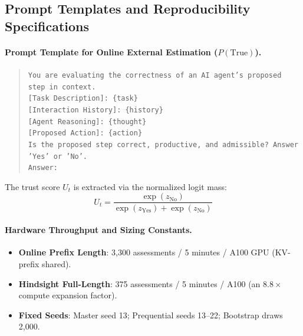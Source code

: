 \subsection{Prompt Templates and Reproducibility Specifications}\label{app:prompts}

\paragraph{Prompt Template for Online External Estimation ($P(\text{True})$).}
\begin{quote}
\small
\texttt{You are evaluating the correctness of an AI agent's proposed step in context.}\\
\texttt{[Task Description]: \{task\}}\\
\texttt{[Interaction History]: \{history\}}\\
\texttt{[Agent Reasoning]: \{thought\}}\\
\texttt{[Proposed Action]: \{action\}}\\
\texttt{Is the proposed step correct, productive, and admissible? Answer 'Yes' or 'No'.}\\
\texttt{Answer:}
\end{quote}

The trust score $U_t$ is extracted via the normalized logit mass:
\begin{equation}
U_t = \frac{\exp(z_{\text{No}})}{\exp(z_{\text{Yes}}) + \exp(z_{\text{No}})}
\end{equation}

\paragraph{Hardware Throughput and Sizing Constants.}
\begin{itemize}
\item \textbf{Online Prefix Length}: 3,300 assessments / 5 minutes / A100 GPU (KV-prefix shared).
\item \textbf{Hindsight Full-Length}: 375 assessments / 5 minutes / A100 (an $8.8\times$ compute expansion factor).
\item \textbf{Fixed Seeds}: Master seed 13; Prequential seeds 13--22; Bootstrap draws 2,000.
\end{itemize}
